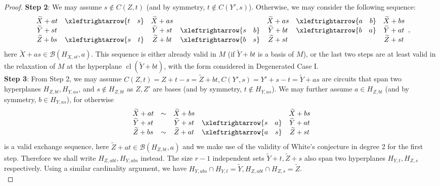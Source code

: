 \documentclass{amsart}
\newcommand{\swap}[2]{\xleftrightarrow{#1 \quad #2}}
\newcommand\Bcal{{\mathcal B}}
\DeclareMathOperator{\cl}{cl}
\begin{document}
\begin{proof}
{\bf Step 2}: We may assume $s\not\in C(Z,t)$ (and by symmetry, $t\not\in C(Y',s)$). Otherwise, we may consider the following sequence:
$$
\begin{array}{c c c c c c c}
   \widetilde{X}+at & \swap{t}{s} & \widetilde{X}+as &          & \widetilde{X}+as  & \swap{a}{b} & \widetilde{X}+bs \\
   \widetilde{Y}+st &            & \widetilde{Y}+st &  \swap{s}{b}  & \widetilde{Y}+bt & \swap{b}{a}  & \widetilde{Y}+at \\
   \widetilde{Z}+bs & \swap{s}{t}  & \widetilde{Z}+bt & \swap{b}{s}  & \widetilde{Z}+st  &            & \widetilde{Z}+st
\end{array},
$$
here $\widetilde{X}+as\in\Bcal(H_{X,st},a)$. This sequence is either already valid in $M$ (if $\widetilde{Y}+bt$ is a basis of $M$), or the last two steps are at least valid in the relaxation of $M$ at the hyperplane $\cl(\widetilde{Y}+bt)$, with the form considered in Degenerated Case I.\\

{\bf Step 3}: From Step 2, we may assume $C(Z,t)=Z+t-s=\widetilde{Z}+bt, C(Y',s)=Y'+s-t=\widetilde{Y}+as$ are circuits that span two hyperplanes $H_{Z,bt}, H_{Y,as}$, and $s\not\in H_{Z,bt}$ as $Z,Z'$ are bases (and by symmetry, $t\not\in H_{Y,as}$). We may further assume $a\in H_{Z,bt}$ (and by symmetry, $b\in H_{Y,as}$), for otherwise
$$
\begin{array}{c c c c c}
   \widetilde{X}+at & \sim & \widetilde{X}+bs  &          & \widetilde{X}+bs \\
   \widetilde{Y}+st &            & \widetilde{Y}+st & \swap{s}{a}  & \widetilde{Y}+at \\
   \widetilde{Z}+bs & \sim  & \widetilde{Z}+at  & \swap{a}{s}   & \widetilde{Z}+st
\end{array}
$$
is a valid exchange sequence, here $\widetilde{Z}+at\in\Bcal(H_{Z,bt},a)$ and we make use of the validity of White's conjecture in degree 2 for the first step. Therefore we shall write $H_{Z,abt}, H_{Y,abs}$ instead. The size $r-1$ independent sets $\widetilde{Y}+t, \widetilde{Z}+s$ also span two hyperplanes $H_{Y,t}, H_{Z,s}$ respectively. Using a similar cardinality argument, we have $H_{Y,abs}\cap H_{Y,t}=\widetilde{Y}, H_{Z,abt}\cap H_{Z,s}=\widetilde{Z}$.\\


\end{proof}
\end{document}
